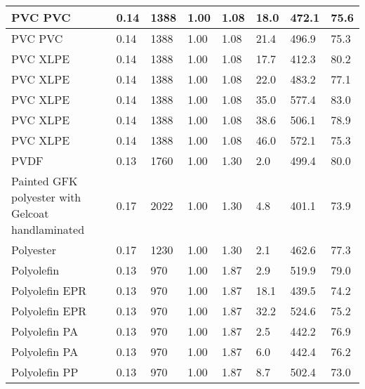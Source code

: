 \begin{table}[!h]
\begin{tabular}{|p{5.5cm}|p{1.0cm}|p{1.0cm}|p{0.8cm}|p{1.4cm}|p{1.0cm}|p{1.0cm}|p{1.2cm}|}
PVC PVC & 0.14 & 1388 & 1.00 & 1.08 & 18.0 & 472.1 & 75.6 \\ \hline 
PVC PVC & 0.14 & 1388 & 1.00 & 1.08 & 21.4 & 496.9 & 75.3 \\ \hline 
PVC XLPE & 0.14 & 1388 & 1.00 & 1.08 & 17.7 & 412.3 & 80.2 \\ \hline 
PVC XLPE & 0.14 & 1388 & 1.00 & 1.08 & 22.0 & 483.2 & 77.1 \\ \hline 
PVC XLPE & 0.14 & 1388 & 1.00 & 1.08 & 35.0 & 577.4 & 83.0 \\ \hline 
PVC XLPE & 0.14 & 1388 & 1.00 & 1.08 & 38.6 & 506.1 & 78.9 \\ \hline 
PVC XLPE & 0.14 & 1388 & 1.00 & 1.08 & 46.0 & 572.1 & 75.3 \\ \hline 
PVDF & 0.13 & 1760 & 1.00 & 1.30 & 2.0 & 499.4 & 80.0 \\ \hline 
Painted GFK polyester with Gelcoat handlaminated & 0.17 & 2022 & 1.00 & 1.30 & 4.8 & 401.1 & 73.9 \\ \hline 
Polyester & 0.17 & 1230 & 1.00 & 1.30 & 2.1 & 462.6 & 77.3 \\ \hline 
Polyolefin & 0.13 & 970 & 1.00 & 1.87 & 2.9 & 519.9 & 79.0 \\ \hline 
Polyolefin EPR & 0.13 & 970 & 1.00 & 1.87 & 18.1 & 439.5 & 74.2 \\ \hline 
Polyolefin EPR & 0.13 & 970 & 1.00 & 1.87 & 32.2 & 524.6 & 75.2 \\ \hline 
Polyolefin PA & 0.13 & 970 & 1.00 & 1.87 & 2.5 & 442.2 & 76.9 \\ \hline 
Polyolefin PA & 0.13 & 970 & 1.00 & 1.87 & 6.0 & 442.4 & 76.2 \\ \hline 
Polyolefin PP & 0.13 & 970 & 1.00 & 1.87 & 8.7 & 502.4 & 73.0 \\ \hline 
\end{tabular}
\label{Properties_RISE_Materials_polymers1}
\end{table}

